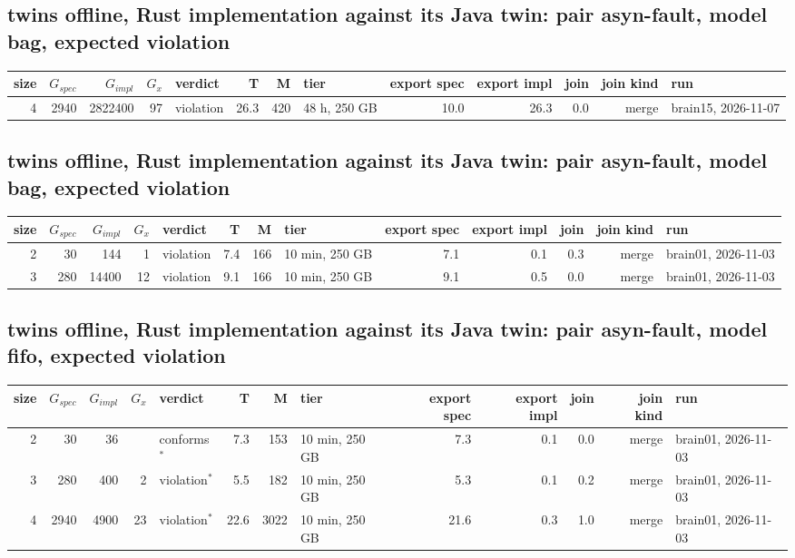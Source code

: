 \documentclass[10pt]{article}
\begin{document}
\subsection*{twins offline, Rust implementation against its Java twin: pair \textsf{asyn-fault}, model bag, expected violation}
\begin{longtable}{@{}rrrrlrrlrrrrl@{}}
\toprule
size & $G_{\mathit{spec}}$ & $G_{\mathit{impl}}$ & $G_x$ & verdict & T & M & tier & export spec & export impl & join & join kind & run \\
\midrule
\endhead
\color{red} 4 & 2940 & 2822400 & 97 & violation & 26.3 & 420 & 48 h, 250 GB & 10.0 & 26.3 & 0.0 & merge & brain15, 2026-11-07 \\
\bottomrule
\end{longtable}
\subsection*{twins offline, Rust implementation against its Java twin: pair \textsf{asyn-fault}, model bag, expected violation}
\begin{longtable}{@{}rrrrlrrlrrrrl@{}}
\toprule
size & $G_{\mathit{spec}}$ & $G_{\mathit{impl}}$ & $G_x$ & verdict & T & M & tier & export spec & export impl & join & join kind & run \\
\midrule
\endhead
\color{blue} 2 & 30 & 144 & 1 & violation & 7.4 & 166 & 10 min, 250 GB & 7.1 & 0.1 & 0.3 & merge & brain01, 2026-11-03 \\
\color{blue} 3 & 280 & 14400 & 12 & violation & 9.1 & 166 & 10 min, 250 GB & 9.1 & 0.5 & 0.0 & merge & brain01, 2026-11-03 \\
\bottomrule
\end{longtable}
\subsection*{twins offline, Rust implementation against its Java twin: pair \textsf{asyn-fault}, model fifo, expected violation}
\begin{longtable}{@{}rrrrlrrlrrrrl@{}}
\toprule
size & $G_{\mathit{spec}}$ & $G_{\mathit{impl}}$ & $G_x$ & verdict & T & M & tier & export spec & export impl & join & join kind & run \\
\midrule
\endhead
\color{blue} 2 & 30 & 36 &  & conforms$^{\ast}$ & 7.3 & 153 & 10 min, 250 GB & 7.3 & 0.1 & 0.0 & merge & brain01, 2026-11-03 \\
\color{blue} 3 & 280 & 400 & 2 & violation$^{\ast}$ & 5.5 & 182 & 10 min, 250 GB & 5.3 & 0.1 & 0.2 & merge & brain01, 2026-11-03 \\
\color{blue} 4 & 2940 & 4900 & 23 & violation$^{\ast}$ & 22.6 & 3022 & 10 min, 250 GB & 21.6 & 0.3 & 1.0 & merge & brain01, 2026-11-03 \\
\bottomrule
\end{longtable}
\end{document}
